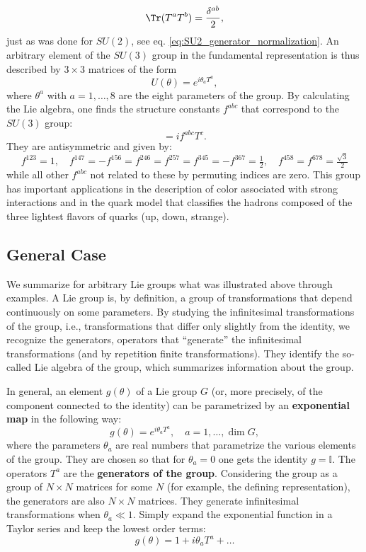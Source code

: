 \begin{equation}
    \Tr(T^a T^b) = \frac{\delta^{ab}}{2},
    \label{eq:SU3_generator_normalization}
\end{equation}
just as was done for $SU(2)$, see eq. \eqref{eq:SU2_generator_normalization}. An arbitrary element of the $SU(3)$ group in the fundamental representation is thus described by $3 \times 3$ matrices of the form
\begin{equation}
    U(\theta) = e^{i \theta_a T^a},
    \label{eq:SU3_exponential_map}
\end{equation}
where $\theta^a$ with $a = 1, \dots, 8$ are the eight parameters of the group. By calculating the Lie algebra, one finds the structure constants $f^{abc}$ that correspond to the $SU(3)$ group:
\begin{equation}
    [T^a, T^b] = i f^{abc} T^c.
    \label{eq:SU3_Lie_algebra}
\end{equation}
They are antisymmetric and given by:
\[
    f^{123} = 1, \quad
    f^{147} = -f^{156} = f^{246} = f^{257} = f^{345} = -f^{367} = \tfrac{1}{2}, \quad
    f^{458} = f^{678} = \tfrac{\sqrt{3}}{2}
\]
while all other $f^{abc}$ not related to these by permuting indices are zero. This group has important applications in the description of color associated with strong interactions and in the quark model that classifies the hadrons composed of the three lightest flavors of quarks (up, down, strange).

\subsection{General Case}

We summarize for arbitrary Lie groups what was illustrated above through examples. A Lie group is, by definition, a group of transformations that depend continuously on some parameters. By studying the infinitesimal transformations of the group, i.e., transformations that differ only slightly from the identity, we recognize the generators, operators that ``generate'' the infinitesimal transformations (and by repetition finite transformations). They identify the so-called Lie algebra of the group, which summarizes information about the group.

In general, an element $g(\theta)$ of a Lie group $G$ (or, more precisely, of the component connected to the identity) can be parametrized by an \textbf{exponential map} in the following way:
\begin{equation}
    g(\theta) = e^{i \theta_a T^a}, \quad a = 1, \dots, \dim G,
    \label{eq:general_Lie_group_exponential_map}
\end{equation}
where the parameters $\theta_a$ are real numbers that parametrize the various elements of the group. They are chosen so that for $\theta_a = 0$ one gets the identity $g = \mathbb{I}$. The operators $T^a$ are the \textbf{generators of the group}. Considering the group as a group of $N \times N$ matrices for some $N$ (for example, the defining representation), the generators are also $N \times N$ matrices. They generate infinitesimal transformations when $\theta_a \ll 1$. Simply expand the exponential function in a Taylor series and keep the lowest order terms:
\[
    g(\theta) = 1 + i \theta_a T^a + \dots
\]

